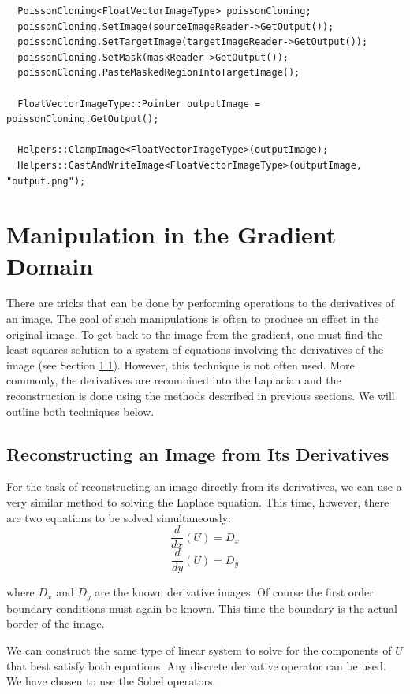 \documentclass{InsightArticle}
\begin{document}
\begin{verbatim}
  PoissonCloning<FloatVectorImageType> poissonCloning;
  poissonCloning.SetImage(sourceImageReader->GetOutput());
  poissonCloning.SetTargetImage(targetImageReader->GetOutput());
  poissonCloning.SetMask(maskReader->GetOutput());
  poissonCloning.PasteMaskedRegionIntoTargetImage();

  FloatVectorImageType::Pointer outputImage = poissonCloning.GetOutput();

  Helpers::ClampImage<FloatVectorImageType>(outputImage);
  Helpers::CastAndWriteImage<FloatVectorImageType>(outputImage, "output.png");
\end{verbatim}

\section{Manipulation in the Gradient Domain}
There are tricks that can be done by performing operations to the derivatives of an image. The goal of such manipulations is often to produce an effect in the original image. To get back to the image from the gradient, one must find the least squares solution to a system of equations involving the derivatives of the image (see Section \ref{sec:ReconstructingFromDerivatives}). However, this technique is not often used. More commonly, the derivatives are recombined into the Laplacian and the reconstruction is done using the methods described in previous sections. We will outline both techniques below.

\subsection{Reconstructing an Image from Its Derivatives}
\label{sec:ReconstructingFromDerivatives}
For the task of reconstructing an image directly from its derivatives, we can use a very similar method to solving the Laplace equation. This time, however, there are two equations to be solved simultaneously:
\begin{equation}
\frac{d}{dx}(U) = D_x
\end{equation}
\begin{equation}
\frac{d}{dy}(U) = D_y
\end{equation}

where $D_x$ and $D_y$ are the known derivative images. Of course the first order boundary conditions must again be known. This time the boundary is the actual border of the image.

We can construct the same type of linear system to solve for the components of $U$ that best satisfy both equations. Any discrete derivative operator can be used. We have chosen to use the Sobel operators:
\end{document}
